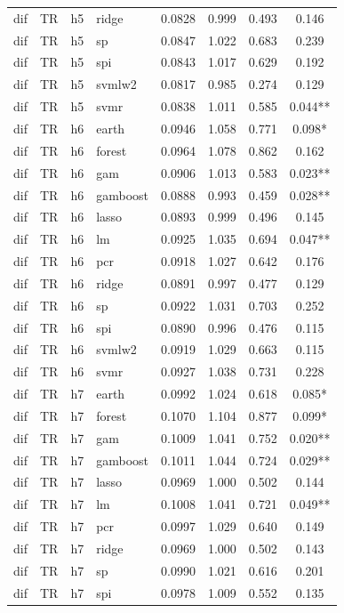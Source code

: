 \begin{ThreePartTable}
\begin{longtable}[t]{llclcccc}
dif & TR & h5 & ridge & 0.0828 & 0.999 & 0.493 & 0.146\\
dif & TR & h5 & sp & 0.0847 & 1.022 & 0.683 & 0.239\\
dif & TR & h5 & spi & 0.0843 & 1.017 & 0.629 & 0.192\\
dif & TR & h5 & svmlw2 & 0.0817 & 0.985 & 0.274 & 0.129\\
dif & TR & h5 & svmr & 0.0838 & 1.011 & 0.585 & 0.044**\\
\addlinespace
dif & TR & h6 & earth & 0.0946 & 1.058 & 0.771 & 0.098*\\
dif & TR & h6 & forest & 0.0964 & 1.078 & 0.862 & 0.162\\
dif & TR & h6 & gam & 0.0906 & 1.013 & 0.583 & 0.023**\\
dif & TR & h6 & gamboost & 0.0888 & 0.993 & 0.459 & 0.028**\\
dif & TR & h6 & lasso & 0.0893 & 0.999 & 0.496 & 0.145\\
dif & TR & h6 & lm & 0.0925 & 1.035 & 0.694 & 0.047**\\
dif & TR & h6 & pcr & 0.0918 & 1.027 & 0.642 & 0.176\\
dif & TR & h6 & ridge & 0.0891 & 0.997 & 0.477 & 0.129\\
dif & TR & h6 & sp & 0.0922 & 1.031 & 0.703 & 0.252\\
dif & TR & h6 & spi & 0.0890 & 0.996 & 0.476 & 0.115\\
dif & TR & h6 & svmlw2 & 0.0919 & 1.029 & 0.663 & 0.115\\
dif & TR & h6 & svmr & 0.0927 & 1.038 & 0.731 & 0.228\\
\addlinespace
dif & TR & h7 & earth & 0.0992 & 1.024 & 0.618 & 0.085*\\
dif & TR & h7 & forest & 0.1070 & 1.104 & 0.877 & 0.099*\\
dif & TR & h7 & gam & 0.1009 & 1.041 & 0.752 & 0.020**\\
dif & TR & h7 & gamboost & 0.1011 & 1.044 & 0.724 & 0.029**\\
dif & TR & h7 & lasso & 0.0969 & 1.000 & 0.502 & 0.144\\
dif & TR & h7 & lm & 0.1008 & 1.041 & 0.721 & 0.049**\\
dif & TR & h7 & pcr & 0.0997 & 1.029 & 0.640 & 0.149\\
dif & TR & h7 & ridge & 0.0969 & 1.000 & 0.502 & 0.143\\
dif & TR & h7 & sp & 0.0990 & 1.021 & 0.616 & 0.201\\
dif & TR & h7 & spi & 0.0978 & 1.009 & 0.552 & 0.135\\

\end{longtable}
\end{ThreePartTable}
